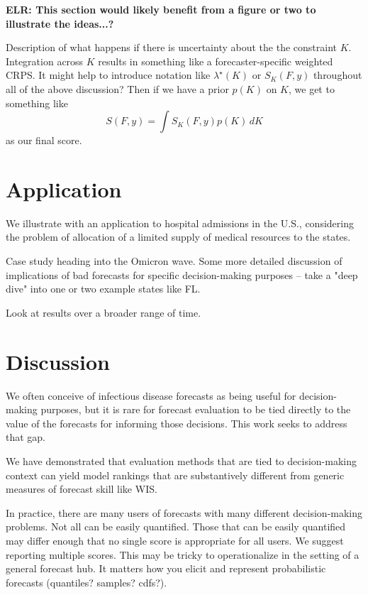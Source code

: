\documentclass{article}
\begin{document}
\textbf{ELR: This section would likely benefit from a figure or two to illustrate the ideas...?}

Description of what happens if there is uncertainty about the the constraint $K$. Integration across $K$ results in something like a forecaster-specific weighted CRPS. It might help to introduce notation like $\lambda^{\star}(K)$ or $S_K(F, y)$ throughout all of the above discussion? Then if we have a prior $p(K)$ on $K$, we get to something like
$$S(F, y) = \int S_K(F,y) p(K) \, d K$$
as our final score.

\section{Application}
\label{sec:application}

We illustrate with an application to hospital admissions in the U.S., considering the problem of allocation of a limited supply of medical resources to the states.

Case study heading into the Omicron wave. Some more detailed discussion of implications of bad forecasts for specific decision-making purposes -- take a "deep dive" into one or two example states like FL.

Look at results over a broader range of time.

\section{Discussion}
\label{sec:discussion}

We often conceive of infectious disease forecasts as being useful for decision-making purposes, but it is rare for forecast evaluation to be tied directly to the value of the forecasts for informing those decisions. This work seeks to address that gap.

We have demonstrated that evaluation methods that are tied to decision-making context can yield model rankings that are substantively different from generic measures of forecast skill like WIS.

In practice, there are many users of forecasts with many different decision-making problems. Not all can be easily quantified. Those that can be easily quantified may differ enough that no single score is appropriate for all users. We suggest reporting multiple scores. This may be tricky to operationalize in the setting of a general forecast hub. It matters how you elicit and represent probabilistic forecasts (quantiles? samples? cdfs?).
\end{document}
